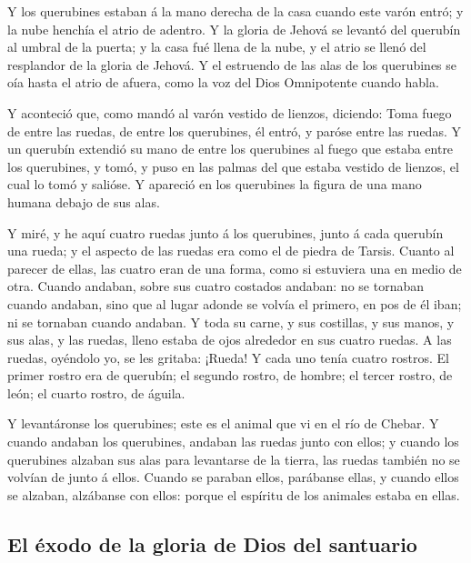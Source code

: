  Y los querubines estaban á la mano derecha de la casa
cuando este varón entró; y la nube henchía el atrio de adentro.
 Y la gloria de Jehová se levantó del querubín al umbral de
la puerta; y la casa fué llena de la nube, y el atrio se llenó del
resplandor de la gloria de Jehová.  Y el estruendo de las
alas de los querubines se oía hasta el atrio de afuera, como la voz del
Dios Omnipotente cuando habla.

 Y aconteció que, como mandó al varón vestido de lienzos,
diciendo: Toma fuego de entre las ruedas, de entre los querubines, él
entró, y paróse entre las ruedas.  Y un querubín extendió su
mano de entre los querubines al fuego que estaba entre los querubines, y
tomó, y puso en las palmas del que estaba vestido de lienzos, el cual lo
tomó y salióse.  Y apareció en los querubines la figura de
una mano humana debajo de sus alas.

 Y miré, y he aquí cuatro ruedas junto á los querubines,
junto á cada querubín una rueda; y el aspecto de las ruedas era como el
de piedra de Tarsis.  Cuanto al parecer de ellas, las
cuatro eran de una forma, como si estuviera una en medio de otra.
 Cuando andaban, sobre sus cuatro costados andaban: no se
tornaban cuando andaban, sino que al lugar adonde se volvía el primero,
en pos de él iban; ni se tornaban cuando andaban.  Y toda
su carne, y sus costillas, y sus manos, y sus alas, y las ruedas, lleno
estaba de ojos alrededor en sus cuatro ruedas.  A las
ruedas, oyéndolo yo, se les gritaba: ¡Rueda!  Y cada uno
tenía cuatro rostros. El primer rostro era de querubín; el segundo
rostro, de hombre; el tercer rostro, de león; el cuarto rostro, de
águila.

 Y levantáronse los querubines; este es el animal que vi en
el río de Chebar.  Y cuando andaban los querubines, andaban
las ruedas junto con ellos; y cuando los querubines alzaban sus alas
para levantarse de la tierra, las ruedas también no se volvían de junto
á ellos.  Cuando se paraban ellos, parábanse ellas, y
cuando ellos se alzaban, alzábanse con ellos: porque el espíritu de los
animales estaba en ellas.

\hypertarget{el-uxe9xodo-de-la-gloria-de-dios-del-santuario}{%
\subsection{El éxodo de la gloria de Dios del
santuario}\label{el-uxe9xodo-de-la-gloria-de-dios-del-santuario}}

